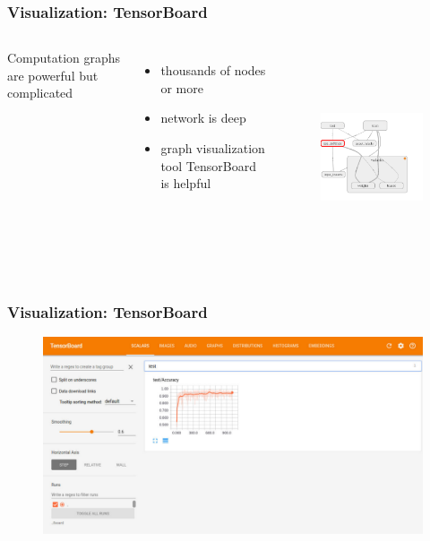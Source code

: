 \begin{frame}
  \MyLogo
  \frametitle{Visualization: TensorBoard}  

\begin{columns}
\scriptsize{
Computation graphs are powerful but complicated
\begin{itemize}
\item  thousands of nodes or more 
\item  network is deep
\item  graph visualization tool TensorBoard is helpful
\end{itemize}
}
%
\begin{figure}[htbp] 
   \includegraphics[height=2.5in]{figures/graphvisualization.png} 
\end{figure}
\end{columns}

\end{frame}

%

\begin{frame}
	\MyLogo
	\frametitle{Visualization: TensorBoard}  

\begin{figure}[htbp] 
\includegraphics[width=\textwidth, height=\textheight]{figures/scalar.pdf} 
\end{figure}

	
\end{frame}

